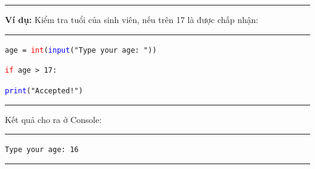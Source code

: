 \rule{\linewidth}{0.2mm}\par
\resetlinenumber
\newpage
\textbf{Ví dụ:}  Kiểm tra tuổi của sinh viên, nếu trên 17 là được chấp nhận:\\
\rule{\linewidth}{0.2mm}\par
\begin{linenumbers}
	\texttt{age = \textcolor{red}{int}(\textcolor{blue}{input}("Type your age: "))}\par
	\texttt{\textcolor{red}{if} age > 17: }\par
	\qquad \texttt{\textcolor{blue}{print}("Accepted!")}
\end{linenumbers}
\rule{\linewidth}{0.2mm}\par
\noindent
\resetlinenumber
Kết quả cho ra ở Console:\\
\rule{\linewidth}{0.2mm}\par
\begin{linenumbers}
	\texttt{Type your age: 16}\par
\end{linenumbers}
\rule{\linewidth}{0.2mm}\par
\resetlinenumber
\newpage